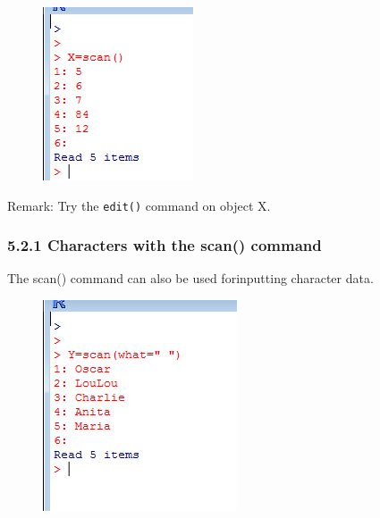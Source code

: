 \documentclass{beamer}
\begin{document}
 	\begin{frame}
 		\begin{figure}
 			\centering
 			\includegraphics[width=0.7\linewidth]{images/scannumbers}
 			\caption{}
 			\label{fig:scannumbers}
 		\end{figure}
 		
 		Remark: Try the \texttt{edit()} command on object X.
 	\end{frame}
 	\begin{frame}
 		\frametitle{5.2.1 Characters with the scan() command}
 		The scan() command can also be used forinputting character data.
 		\begin{figure}
 			\centering
 			\includegraphics[width=0.7\linewidth]{images/scandognames}
 			\caption{}
 			\label{fig:scandognames}
 		\end{figure}
 		
 	\end{frame}
\end{document}
